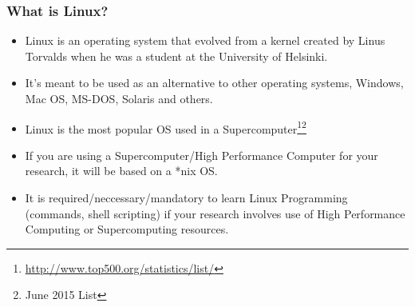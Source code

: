 \documentclass[10pt,t]{beamer}
\begin{document}
\begin{frame}
  \frametitle{What is Linux?}
  \begin{itemize}
    \item Linux is an operating system that evolved from a kernel created by Linus Torvalds when he was a student at the University of Helsinki. 
    \item It's meant to be used as an alternative to other operating systems, Windows, Mac OS, MS-DOS, Solaris and others. 
    \item Linux is the most popular OS used in a Supercomputer\let\thefootnote\relax\footnote{\tiny \url{http://www.top500.org/statistics/list/}}\let\thefootnote\relax\footnote{\tiny June 2015 List}
      
    \item If you are using a Supercomputer/High Performance Computer for your research, it will be based on a *nix OS.
    \item It is required/neccessary/mandatory to learn Linux Programming (commands, shell scripting) if your research involves use of High Performance Computing or Supercomputing resources.
  \end{itemize}
\end{frame}
\end{document}
